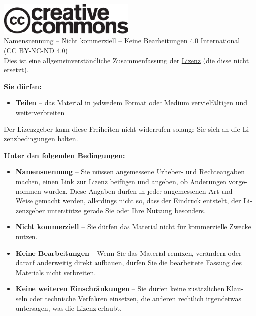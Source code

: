 
\thispagestyle{empty}
\begin{otherlanguage}{ngerman}

\begin{center}

\href{https://creativecommons.org/licenses/by-nc-nd/4.0/deed.de}{
\includegraphics*[width=0.5\textwidth]{cc-logo}\\[0.5ex]
{Namensnennung -- Nicht kommerziell -- Keine Bearbeitungen 4.0 International\\
(CC BY-NC-ND 4.0)}
} \\
{\footnotesize \noindent Dies ist eine allgemeinverständliche Zusammenfassung der \href{https://creativecommons.org/licenses/by-nc-nd/4.0/legalcode}{Lizenz} (die diese nicht ersetzt).}
\end{center}

\medskip

\noindent \textbf{Sie dürfen:} \vspace{-0.25cm}
\begin{itemize}
	\item[] \textbf{Teilen} -- {\small das Material in jedwedem Format oder Medium vervielfältigen und weiterverbreiten}
\end{itemize}
{\small \noindent Der Lizenzgeber kann diese Freiheiten nicht widerrufen solange Sie sich an die Lizenzbedingungen halten.}

\medskip


\noindent \textbf{Unter den folgenden Bedingungen:} \vspace{-0.25cm}
\begin{itemize}
	\item[\textcolor{gray}{{\Large \ccAttribution}}] \textbf{Namensnennung} -- {\small Sie müssen angemessene Urheber- und Rechteangaben machen, einen Link zur Lizenz beifügen und angeben, ob Änderungen vorgenommen wurden. Diese Angaben dürfen in jeder angemessenen Art und Weise gemacht werden, allerdings nicht so, dass der Eindruck entsteht, der Lizenzgeber unterstütze gerade Sie oder Ihre Nutzung besonders.}
	\item[\textcolor{gray}{{\Large \ccNonCommercialEU}}] \textbf{Nicht kommerziell} -- {\small Sie dürfen das Material nicht für kommerzielle Zwecke nutzen.}
	\item[\textcolor{gray}{{\Large \ccNoDerivatives}}] \textbf{Keine Bearbeitungen} -- {\small Wenn Sie das Material remixen, verändern oder darauf anderweitig direkt aufbauen, dürfen Sie die bearbeitete Fassung des Materials nicht verbreiten.}
	\item[] \textbf{Keine weiteren Einschränkungen} -- {\small Sie dürfen keine zusätzlichen Klauseln oder technische Verfahren einsetzen, die anderen rechtlich irgendetwas untersagen, was die Lizenz erlaubt.}
\end{itemize}


\end{otherlanguage}
